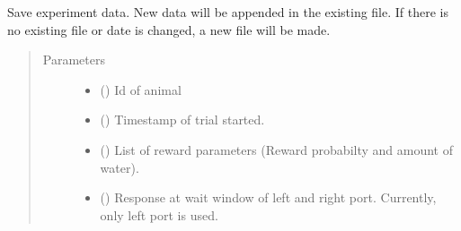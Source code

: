 \documentclass[letterpaper,10pt,english]{sphinxmanual}
\begin{document}
\begin{fulllineitems}
\begin{fulllineitems}
\label{\detokenize{NoSeMazeController/Controllers:Controllers.ExperimentControl.ExperimentWorker.save_data}}
\pysigstartsignatures
{}
\pysigstopsignatures
\sphinxAtStartPar
Save experiment data. New data will be appended in the existing file.
If there is no existing file or date is changed, a new file will be
made.
\begin{quote}\begin{description}
\item[{Parameters}] \leavevmode\begin{itemize}
\item {} 
\sphinxAtStartPar
{} () \textendash{} Id of animal

\item {} 
\sphinxAtStartPar
{} () \textendash{} Timestamp of trial started.

\item {} 
\sphinxAtStartPar
{} () \textendash{} List of reward parameters (Reward probabilty and amount of water).

\item {} 
\sphinxAtStartPar
{} () \textendash{} Response at wait window of left and right port. Currently, only left
port is used.


\end{itemize}
\end{description}
\end{quote}
\end{fulllineitems}
\end{fulllineitems}
\end{document}
